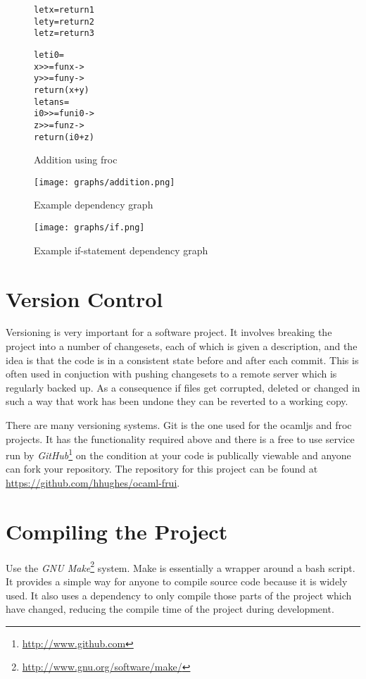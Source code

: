 \begin{figure}
  \begin{alltt}
let x = return 1
let y = return 2
let z = return 3

let i0 =
    x >>= fun x ->
        y >>= fun y ->
            return (x + y)
let ans =
    i0 >>= fun i0 ->
        z >>= fun z ->
            return (i0 + z)
  \end{alltt}
  \caption{Addition using froc}
  \label{add_code}
\end{figure}

\begin{figure}
  \centering
  \texttt{[image: graphs/addition.png]}
  \caption{Example dependency graph}
  \label{add_graph}
\end{figure}

\begin{figure}
  \centering
  \texttt{[image: graphs/if.png]}
  \caption{Example if-statement dependency graph}
  \label{if_graph}
\end{figure}

\section{Version Control}

Versioning is very important for a software project. It involves breaking the project into a number of changesets, each of which is given a description, and the idea is that the code is in a consistent state before and after each commit. This is often used in conjuction with pushing changesets to a remote server which is regularly backed up. As a consequence if files get corrupted, deleted or changed in such a way that work has been undone they can be reverted to a working copy.

There are many versioning systems. Git is the one used for the ocamljs and froc projects. It has the functionality required above and there is a free to use service run by \emph{GitHub}\footnote{\url{http://www.github.com}} on the condition at your code is publically viewable and anyone can fork your repository. The repository for this project can be found at \url{https://github.com/hhughes/ocaml-frui}.

\section{Compiling the Project}

Use the \emph{GNU Make}\footnote{\url{http://www.gnu.org/software/make/}} system. Make is essentially a wrapper around a bash script. It provides a simple way for anyone to compile source code because it is widely used. It also uses a dependency to only compile those parts of the project which have changed, reducing the compile time of the project during development.

